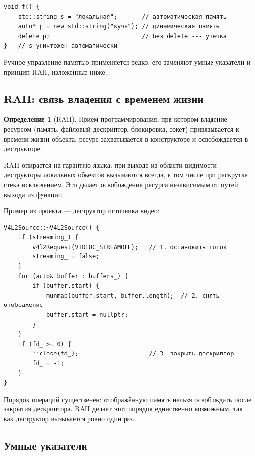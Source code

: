 \documentclass[11pt,a4paper]{article}
\theoremstyle{definition}
\newtheorem{definition}{Определение}[section]
\theoremstyle{remark}
\begin{document}
\begin{lstlisting}
void f() {
    std::string s = "локальная";       // автоматическая память
    auto* p = new std::string("куча"); // динамическая память
    delete p;                          // без delete --- утечка
}   // s уничтожен автоматически
\end{lstlisting}

Ручное управление памятью применяется редко: его заменяют умные указатели и
принцип RAII, изложенные ниже.

\subsection{RAII: связь владения с временем жизни}

\begin{definition}[RAII]
Приём программирования, при котором владение ресурсом (память, файловый
дескриптор, блокировка, сокет) привязывается к времени жизни объекта: ресурс
захватывается в конструкторе и освобождается в деструкторе.
\end{definition}

RAII опирается на гарантию языка: при выходе из области видимости деструкторы
локальных объектов вызываются всегда, в том числе при раскрутке стека
исключением. Это делает освобождение ресурса независимым от путей выхода из
функции.

Пример из проекта --- деструктор источника видео:

\begin{lstlisting}
V4L2Source::~V4L2Source() {
    if (streaming_) {
        v4l2Request(VIDIOC_STREAMOFF);   // 1. остановить поток
        streaming_ = false;
    }
    for (auto& buffer : buffers_) {
        if (buffer.start) {
            munmap(buffer.start, buffer.length);  // 2. снять отображение
            buffer.start = nullptr;
        }
    }
    if (fd_ >= 0) {
        ::close(fd_);                    // 3. закрыть дескриптор
        fd_ = -1;
    }
}
\end{lstlisting}

Порядок операций существенен: отображённую память нельзя освобождать после
закрытия дескриптора. RAII делает этот порядок единственно возможным, так как
деструктор вызывается ровно один раз.

\subsection{Умные указатели}
\end{document}
